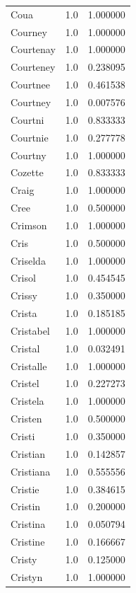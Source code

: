 \documentclass[
  letterpaper,
  DIV=11,
  numbers=noendperiod]{scrreprt}
\begin{document}
\begin{tabular}{lrr}
Coua            &   1.0 &   1.000000 \\
Courney         &   1.0 &   1.000000 \\
Courtenay       &   1.0 &   1.000000 \\
Courteney       &   1.0 &   0.238095 \\
Courtnee        &   1.0 &   0.461538 \\
Courtney        &   1.0 &   0.007576 \\
Courtni         &   1.0 &   0.833333 \\
Courtnie        &   1.0 &   0.277778 \\
Courtny         &   1.0 &   1.000000 \\
Cozette         &   1.0 &   0.833333 \\
Craig           &   1.0 &   1.000000 \\
Cree            &   1.0 &   0.500000 \\
Crimson         &   1.0 &   1.000000 \\
Cris            &   1.0 &   0.500000 \\
Criselda        &   1.0 &   1.000000 \\
Crisol          &   1.0 &   0.454545 \\
Crissy          &   1.0 &   0.350000 \\
Crista          &   1.0 &   0.185185 \\
Cristabel       &   1.0 &   1.000000 \\
Cristal         &   1.0 &   0.032491 \\
Cristalle       &   1.0 &   1.000000 \\
Cristel         &   1.0 &   0.227273 \\
Cristela        &   1.0 &   1.000000 \\
Cristen         &   1.0 &   0.500000 \\
Cristi          &   1.0 &   0.350000 \\
Cristian        &   1.0 &   0.142857 \\
Cristiana       &   1.0 &   0.555556 \\
Cristie         &   1.0 &   0.384615 \\
Cristin         &   1.0 &   0.200000 \\
Cristina        &   1.0 &   0.050794 \\
Cristine        &   1.0 &   0.166667 \\
Cristy          &   1.0 &   0.125000 \\
Cristyn         &   1.0 &   1.000000 \\

\end{tabular}
\end{document}
